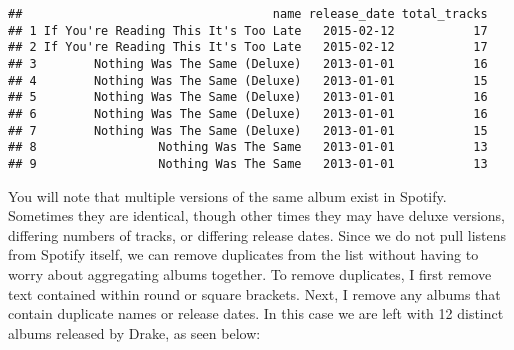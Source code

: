 \documentclass[
  11pt,
]{article}
\newenvironment{Shaded}{\begin{snugshade}}{\end{snugshade}}
\newcommand{\FunctionTok}[1]{\textcolor[rgb]{0.00,0.00,0.00}{#1}}
\newcommand{\NormalTok}[1]{#1}
\newcommand{\OtherTok}[1]{\textcolor[rgb]{0.56,0.35,0.01}{#1}}
\newcommand{\SpecialCharTok}[1]{\textcolor[rgb]{0.00,0.00,0.00}{#1}}
\newcommand{\StringTok}[1]{\textcolor[rgb]{0.31,0.60,0.02}{#1}}
\begin{document}
\begin{verbatim}
##                                   name release_date total_tracks
## 1 If You're Reading This It's Too Late   2015-02-12           17
## 2 If You're Reading This It's Too Late   2015-02-12           17
## 3        Nothing Was The Same (Deluxe)   2013-01-01           16
## 4        Nothing Was The Same (Deluxe)   2013-01-01           15
## 5        Nothing Was The Same (Deluxe)   2013-01-01           16
## 6        Nothing Was The Same (Deluxe)   2013-01-01           16
## 7        Nothing Was The Same (Deluxe)   2013-01-01           15
## 8                 Nothing Was The Same   2013-01-01           13
## 9                 Nothing Was The Same   2013-01-01           13
\end{verbatim}

You will note that multiple versions of the same album exist in Spotify.
Sometimes they are identical, though other times they may have deluxe
versions, differing numbers of tracks, or differing release dates. Since
we do not pull listens from Spotify itself, we can remove duplicates
from the list without having to worry about aggregating albums together.
To remove duplicates, I first remove text contained within round or
square brackets. Next, I remove any albums that contain duplicate names
or release dates. In this case we are left with 12 distinct albums
released by Drake, as seen below:

\begin{Shaded}
\end{Shaded}
\end{document}
